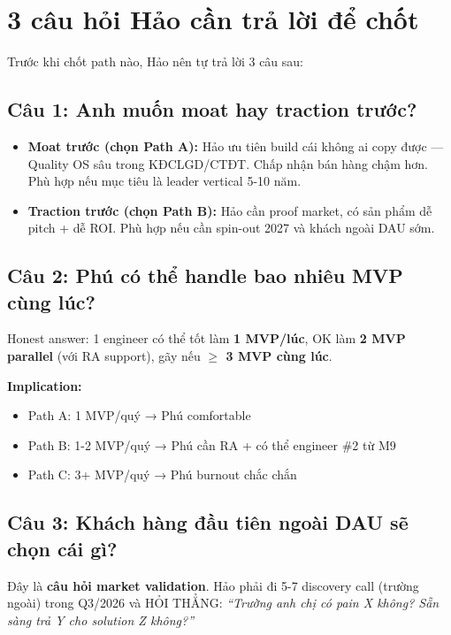 \documentclass[11pt,a4paper]{article}
\begin{document}
\clearpage

\section{3 câu hỏi Hảo cần trả lời để chốt}

Trước khi chốt path nào, Hảo nên tự trả lời 3 câu sau:

\subsection{Câu 1: Anh muốn moat hay traction trước?}

\begin{itemize}
\item \textbf{Moat trước (chọn Path A):} Hảo ưu tiên build cái không ai copy được --- Quality OS sâu trong KĐCLGD/CTĐT. Chấp nhận bán hàng chậm hơn. Phù hợp nếu mục tiêu là leader vertical 5-10 năm.
\item \textbf{Traction trước (chọn Path B):} Hảo cần proof market, có sản phẩm dễ pitch + dễ ROI. Phù hợp nếu cần spin-out 2027 và khách ngoài DAU sớm.
\end{itemize}

\subsection{Câu 2: Phú có thể handle bao nhiêu MVP cùng lúc?}

Honest answer: 1 engineer có thể tốt làm \textbf{1 MVP/lúc}, OK làm \textbf{2 MVP parallel}
(với RA support), gãy nếu \textbf{$\geq$ 3 MVP cùng lúc}.

\textbf{Implication:}
\begin{itemize}
\item Path A: 1 MVP/quý → Phú comfortable
\item Path B: 1-2 MVP/quý → Phú cần RA + có thể engineer \#2 từ M9
\item Path C: 3+ MVP/quý → Phú burnout chắc chắn
\end{itemize}

\subsection{Câu 3: Khách hàng đầu tiên ngoài DAU sẽ chọn cái gì?}

Đây là \textbf{câu hỏi market validation}. Hảo phải đi 5-7 discovery call (trường ngoài)
trong Q3/2026 và HỎI THẲNG: \textit{``Trường anh chị có pain X không? Sẵn sàng trả Y cho
solution Z không?''}
\end{document}
